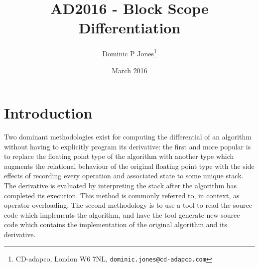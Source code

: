 \documentclass[a4paper,10pt]{article}
\title{AD2016 - Block Scope Differentiation}
\author{Dominic P Jones\footnote{CD-adapco, London W6 7NL, \texttt{dominic.jones@cd-adapco.com}}}
\date{March 2016}
\def\CC{{C\nolinebreak[4]\hspace{-.05em}\raisebox{.4ex}{\tiny\bf ++}}}
\begin{document}
\maketitle




\section{Introduction}
Two dominant methodologies exist for computing the differential of an algorithm without having to explicitly program its derivative: the first and more popular is to replace the floating point type of the algorithm with another type which augments the relational behaviour of the original floating point type with the side effects of recording every operation and associated state to some unique stack.
The derivative is evaluated by interpreting the stack after the algorithm has completed its execution. This method is commonly referred to, in context, as operator overloading. The second methodology is to use a tool to read the source code which implements the algorithm, and have the tool generate new source code which contains the implementation of the original algorithm and its derivative.
\end{document}
